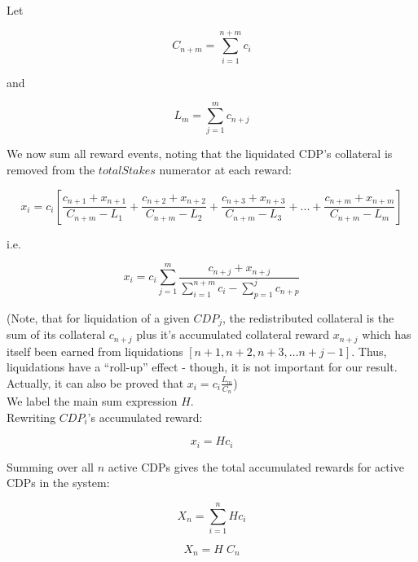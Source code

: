 \documentclass[reqno]{article}
\begin{document}
Let

\begin{equation} 
    C_{n+m}=\sum\limits^{n+m}_{i=1}c_i
\end{equation}

\bigskip
and

\begin{equation} 
    L_m=\sum\limits^m_{j=1}c_{n+j}
\end{equation}

\bigskip
We now sum all reward events, noting that the liquidated CDP’s collateral is removed from the $totalStakes$ numerator at each reward:

\begin{equation} 
    x_i=c_i\left[\frac{c_{n+1}+x_{n+1}}{C_{n+m}-L_1}+\frac{c_{n+2}+x_{n+2}}{C_{n+m}-L_2}+\frac{c_{n+3}+x_{n+3}}{C_{n+m}-L_3}+...+\frac{c_{n+m}+x_{n+m}}{C_{n+m}-L_m}\right]
\end{equation}

\bigskip
i.e.

\begin{equation} 
    x_i=c_i\sum\limits^m_{j=1}\frac{c_{n+j}+x_{n+j}}{\sum\limits^{n+m}_{i=1}c_i-\sum\limits^j_{p=1}c_{n+p}}
\end{equation}

\bigskip
(Note, that for liquidation of a given $CDP_j$, the redistributed collateral is the sum of its collateral $c_{n+j}$ plus it’s accumulated collateral reward $x_{n+j}$ which has itself been earned from liquidations $[n+1, n+2, n+3, … n+j-1]$.  Thus, liquidations have a “roll-up” effect - though, it is not important for our result. Actually, it can also be proved that $x_i=c_i\frac{L_m}{C_n}$)\\

We label the main sum expression $H$.\\

Rewriting $CDP_i$’s accumulated reward:

\begin{equation} 
    x_i=Hc_i
\end{equation}

\bigskip
Summing over all $n$ active CDPs gives the total accumulated rewards for active CDPs in the system:

\begin{equation} 
    X_n=\sum\limits^n_{i=1}Hc_i
\end{equation}

\begin{equation} 
    X_n=H \; C_n
\end{equation}
\end{document}
